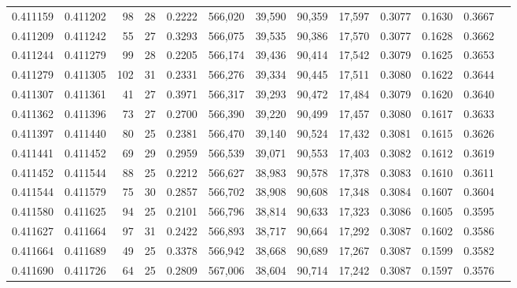\begin{tabular}{rrrrrrrrrrrrr}
0.411159 & 0.411202 &    98 &  28 &                                     0.2222 & 566,020 &  39,590 &  90,359 &  17,597 & 0.3077 & 0.1630 & 0.3667 \\
0.411209 & 0.411242 &    55 &  27 &                                     0.3293 & 566,075 &  39,535 &  90,386 &  17,570 & 0.3077 & 0.1628 & 0.3662 \\
0.411244 & 0.411279 &    99 &  28 &                                     0.2205 & 566,174 &  39,436 &  90,414 &  17,542 & 0.3079 & 0.1625 & 0.3653 \\
0.411279 & 0.411305 &   102 &  31 &                                     0.2331 & 566,276 &  39,334 &  90,445 &  17,511 & 0.3080 & 0.1622 & 0.3644 \\
0.411307 & 0.411361 &    41 &  27 &                                     0.3971 & 566,317 &  39,293 &  90,472 &  17,484 & 0.3079 & 0.1620 & 0.3640 \\
0.411362 & 0.411396 &    73 &  27 &                                     0.2700 & 566,390 &  39,220 &  90,499 &  17,457 & 0.3080 & 0.1617 & 0.3633 \\
0.411397 & 0.411440 &    80 &  25 &                                     0.2381 & 566,470 &  39,140 &  90,524 &  17,432 & 0.3081 & 0.1615 & 0.3626 \\
0.411441 & 0.411452 &    69 &  29 &                                     0.2959 & 566,539 &  39,071 &  90,553 &  17,403 & 0.3082 & 0.1612 & 0.3619 \\
0.411452 & 0.411544 &    88 &  25 &                                     0.2212 & 566,627 &  38,983 &  90,578 &  17,378 & 0.3083 & 0.1610 & 0.3611 \\
0.411544 & 0.411579 &    75 &  30 &                                     0.2857 & 566,702 &  38,908 &  90,608 &  17,348 & 0.3084 & 0.1607 & 0.3604 \\
0.411580 & 0.411625 &    94 &  25 &                                     0.2101 & 566,796 &  38,814 &  90,633 &  17,323 & 0.3086 & 0.1605 & 0.3595 \\
0.411627 & 0.411664 &    97 &  31 &                                     0.2422 & 566,893 &  38,717 &  90,664 &  17,292 & 0.3087 & 0.1602 & 0.3586 \\
0.411664 & 0.411689 &    49 &  25 &                                     0.3378 & 566,942 &  38,668 &  90,689 &  17,267 & 0.3087 & 0.1599 & 0.3582 \\
0.411690 & 0.411726 &    64 &  25 &                                     0.2809 & 567,006 &  38,604 &  90,714 &  17,242 & 0.3087 & 0.1597 & 0.3576 \\

\end{tabular}
